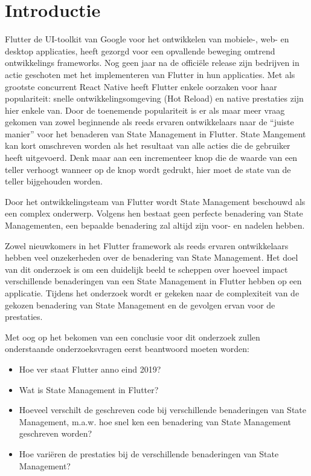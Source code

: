 
\section{Introductie} %
\label{sec:introductie}

Flutter de UI-toolkit van Google voor het ontwikkelen van mobiele-, web- en desktop applicaties,
heeft gezorgd voor een opvallende beweging omtrend ontwikkelings frameworks.
Nog geen jaar na de officiële release zijn bedrijven in actie geschoten met het implementeren van Flutter
in hun applicaties.
Met als grootste concurrent React Native heeft Flutter enkele oorzaken voor haar populariteit: snelle ontwikkelingsomgeving (Hot Reload) en native prestaties zijn hier enkele van.
Door de toenemende populariteit is er als maar meer vraag gekomen van zowel beginnende als
reeds ervaren ontwikkelaars naar de ``juiste manier'' voor het benaderen van State Management in Flutter.
State Mangement kan kort omschreven worden als het resultaat van alle acties die de gebruiker heeft
uitgevoerd.
Denk maar aan een incrementeer knop die de waarde van een teller verhoogt wanneer op de knop wordt gedrukt, hier moet de state van de teller bijgehouden worden.

Door het ontwikkelingsteam van Flutter wordt State Management beschouwd als een complex onderwerp. Volgens hen bestaat geen perfecte benadering van State Managementen, een bepaalde benadering zal altijd zijn voor- en nadelen hebben.

Zowel nieuwkomers in het Flutter framework als reeds ervaren ontwikkelaars hebben 
veel onzekerheden over de benadering van State Management.
Het doel van dit onderzoek is om een duidelijk beeld te scheppen over hoeveel impact
verschillende benaderingen van een State Management in Flutter hebben op een applicatie.
Tijdens het onderzoek wordt er gekeken naar de complexiteit van de gekozen benadering van State Management en de gevolgen ervan voor de prestaties.

Met oog op het bekomen van een conclusie voor dit onderzoek
zullen onderstaande onderzoeksvragen eerst beantwoord moeten worden:
\begin{itemize}
    \item Hoe ver staat Flutter anno eind 2019?
    \item Wat is State Management in Flutter?
    \item Hoeveel verschilt de geschreven code bij verschillende benaderingen van State Management, m.a.w. hoe snel 
    ken een benadering van State Management geschreven worden?
    \item Hoe variëren de prestaties bij de verschillende benaderingen van State Management?
\end{itemize}
    
